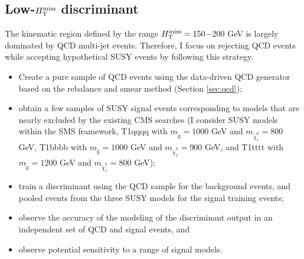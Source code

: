 \subsection{Low-$H_{\text{T}}^{\rm miss}$ discriminant}
The kinematic region defined by the range $H_{\text{T}}^{\rm miss}=150$$-$$200$ GeV is largely dominated by QCD multi-jet events. Therefore, I focus on rejecting QCD events while accepting hypothetical SUSY events by following this strategy.
\begin{itemize}
\item Create a pure sample of QCD events using the data-driven QCD generator based on the rebalance and smear method (Section \ref{sec:qcd});
\item obtain a few samples of SUSY signal events corresponding to models that are nearly excluded by the existing CMS searches (I consider SUSY models within the SMS framework, T1qqqq with $m_{\tilde{\text{g}}}=1000$ GeV and $m_{\tilde{\chi}^{0}_{1}}=800$ GeV,  T1bbbb with $m_{\tilde{\text{g}}}=1000$ GeV and $m_{\tilde{\chi}^{0}_{1}}=900$ GeV, and T1tttt with $m_{\tilde{\text{g}}}=1200$ GeV and $m_{\tilde{\chi}^{0}_{1}}=800$ GeV);
\item train a discriminant using the QCD sample for the background events, and pooled events from the three SUSY models for the signal training events;
\item observe the accuracy of the modeling of the discriminant output in an independent set of QCD and signal events, and
\item observe potential sensitivity to a range of signal models.
\end{itemize}


